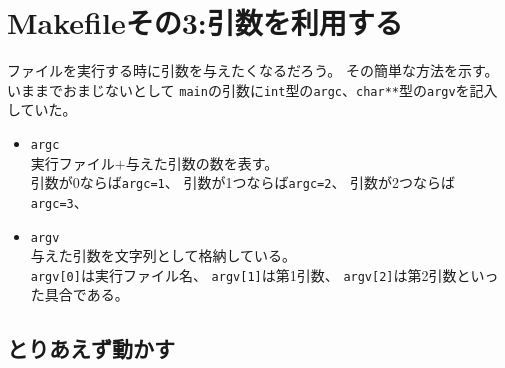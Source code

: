  \section{Makefileその3:引数を利用する}
 
 
 ファイルを実行する時に引数を与えたくなるだろう。
 その簡単な方法を示す。
 いままでおまじないとして
 \verb|main|の引数に\verb|int|型の\verb|argc|、\verb|char**|型の\verb|argv|を記入していた。
 \begin{itemize}
  \item \verb|argc| \\
	実行ファイル$+$与えた引数の数を表す。 \\
	引数が0ならば\verb|argc=1|、
	引数が1つならば\verb|argc=2|、
	引数が2つならば\verb|argc=3|、
	
  \item \verb|argv| \\
	与えた引数を文字列として格納している。\\
	\verb|argv[0]|は実行ファイル名、
	\verb|argv[1]|は第1引数、
	\verb|argv[2]|は第2引数といった具合である。
 \end{itemize}
 
 
 
\subsection{とりあえず動かす}

